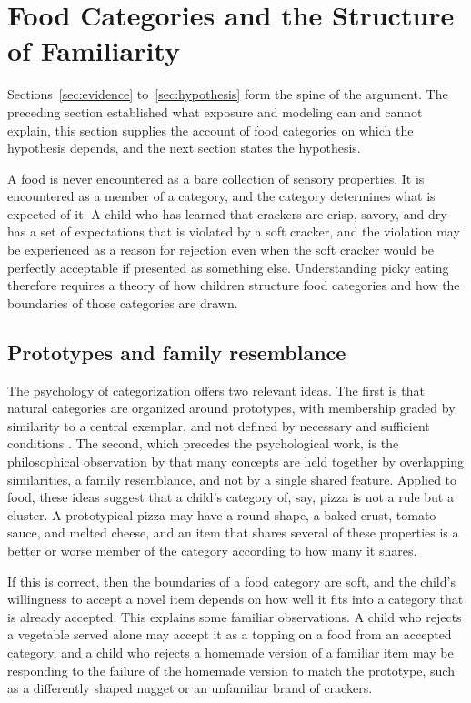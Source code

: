 \documentclass[11pt]{article}
\theoremstyle{remark}
\begin{document}
\section{Food Categories and the Structure of Familiarity}\label{sec:categories}

Sections~\ref{sec:evidence} to~\ref{sec:hypothesis} form the spine of the argument. The preceding section established what exposure and modeling can and cannot explain, this section supplies the account of food categories on which the hypothesis depends, and the next section states the hypothesis.

A food is never encountered as a bare collection of sensory properties. It is encountered as a member of a category, and the category determines what is expected of it. A child who has learned that crackers are crisp, savory, and dry has a set of expectations that is violated by a soft cracker, and the violation may be experienced as a reason for rejection even when the soft cracker would be perfectly acceptable if presented as something else. Understanding picky eating therefore requires a theory of how children structure food categories and how the boundaries of those categories are drawn.

\subsection{Prototypes and family resemblance}

The psychology of categorization offers two relevant ideas. The first is that natural categories are organized around prototypes, with membership graded by similarity to a central exemplar, and not defined by necessary and sufficient conditions \citep{rosch1975family}. The second, which precedes the psychological work, is the philosophical observation by \citet{wittgenstein1953philosophical} that many concepts are held together by overlapping similarities, a family resemblance, and not by a single shared feature. Applied to food, these ideas suggest that a child's category of, say, pizza is not a rule but a cluster. A prototypical pizza may have a round shape, a baked crust, tomato sauce, and melted cheese, and an item that shares several of these properties is a better or worse member of the category according to how many it shares.

If this is correct, then the boundaries of a food category are soft, and the child's willingness to accept a novel item depends on how well it fits into a category that is already accepted. This explains some familiar observations. A child who rejects a vegetable served alone may accept it as a topping on a food from an accepted category, and a child who rejects a homemade version of a familiar item may be responding to the failure of the homemade version to match the prototype, such as a differently shaped nugget or an unfamiliar brand of crackers.
\end{document}
